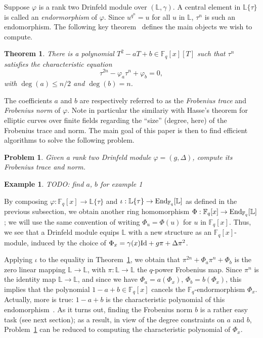 \documentclass[sigconf]{acmart}
\newtheorem{theorem}{Theorem}
\newtheorem{example}{Example}
\newtheorem{problem}{Problem}
\newcommand{\F}{\mathbb{F}}
\renewcommand{\L}{\mathbb{L}}
\newcommand{\ang}[1]{\{#1\}}
\begin{document}
Suppose $\varphi$ is a rank two Drinfeld module over $(\L,\gamma)$. A
central element in $\L\ang{\tau}$ is called an {\em endormorphism} of
$\varphi$. Since $u^{q^n} = u$ for all $u$ in $\L$, $\tau^n$ is such
an endomorphism. The following key theorem~\cite{frobdist} defines the
main objects we wish to compute.
\begin{theorem}\label{charpoly}
  There is a polynomial $T^2 -aT + b \in \F_q[x][T]$ such that
  $\tau^n$ satisfies the characteristic equation
  \begin{equation} \tau^{2n} - \varphi_a \tau^n + \varphi_b = 0,\end{equation}
  with $\deg(a) \le n/2$ and $\deg(b)=n$.
\end{theorem}
The coefficients $a$ and $b$ are respectively referred to as the
\textit{Frobenius trace} and \textit{Frobenius norm} of $\varphi$.
Note in particular the similariy with Hasse's theorem for elliptic 
curves over finite fields regarding the ``size'' (degree, here) of 
the Frobenius trace and norm.
The main goal of this paper is then to find efficient algorithms to
solve the following problem.
\begin{problem}\label{pb1}
  Given a rank two Drinfeld module $\varphi = (g,\Delta)$, compute its
  Frobenius trace and norm.
\end{problem}

\begin{example}
TODO: find $a$, $b$ for example 1
\end{example}


By composing $\varphi: \F_q[x]\to \L\ang{\tau}$ and
$\iota:\L\ang{\tau} \to {\rm End}_{\F_q}[\L]$ as defined in the
previous subsection, we obtain another ring homomorphism $\Phi:
\F_q[x]\to {\rm End}_{\F_q}[\L]$; we will use the same convention of
writing $\Phi_u=\Phi(u)$ for $u$ in $\F_q[x]$. Thus, we see that a
Drinfeld module equips $\L$ with a new structure as an
$\F_q[x]$-module, induced by the choice of $\Phi_x = \gamma(x) {\rm
  Id} + g \pi + \Delta \pi^2$.

Applying $\iota$ to the equality in Theorem~\ref{charpoly}, we obtain
that $\pi^{2n} + \Phi_a \pi^n + \Phi_b$ is the zero linear mapping $\L
\to \L$, with $\pi:\L \to \L$ the $q$-power Frobenius map. Since
$\pi^{n}$ is the identity map $\L\to\L$, and since we have $\Phi_a =
a(\Phi_x)$, $\Phi_b = b(\Phi_x)$, this implies that the polynomial
$1-a+b \in \F_q[x]$ cancels the $\F_q$-endormorphism
$\Phi_x$. Actually, more is true: $1-a+b$ is the characteristic
polynomial of this endomorphism~\cite[Th.~5.1]{GEKELE1991187}.  As it
turns out, finding the Frobenius norm $b$ is a rather easy task (see
next section); as a result, in view of the degree constraints on $a$
and $b$, Problem~\ref{pb1} can be reduced to computing the
characteristic polynomial of $\Phi_x$.
\end{document}
